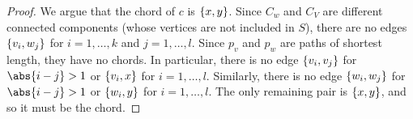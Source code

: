 \begin{proposition}
\begin{proof}
We argue that the chord of $c$ is $\{x, y\}$.
Since $C_w$ and $C_V$ are different connected components (whose vertices are not included in $S$), there are no edges $\{v_i, w_j\}$ for $i = 1, \dots, k$ and $j = 1, \dots, l$.
Since $p_v$ and $p_w$ are paths of shortest length, they have no chords.
In particular, there is no edge $\{v_i, v_j\}$ for $\abs{i - j} > 1$ or $\{v_i, x\}$ for $i = 1, \dots, l$.
Similarly, there is no edge $\{w_i, w_j\}$ for $\abs{i - j} > 1$ or $\{w_i, y\}$ for $i = 1, \dots, l$.
The only remaining pair is $\{x, y\}$, and so it must be the chord.
\end{proof}
\end{proposition}

